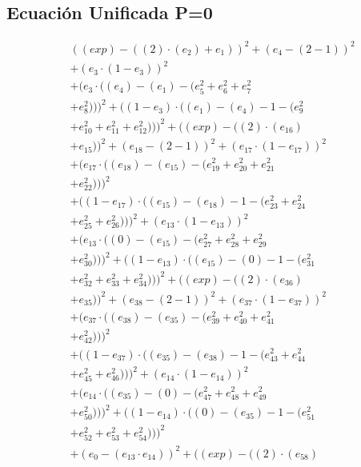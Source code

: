 \documentclass[10pt, a4paper]{article}
\begin{document}
\subsection*{Ecuación Unificada P=0}
\begin{align*}
& ((exp) - ((2)  \cdot  (e_{2}) + e_{1}))^{2} + (e_{4} - (2 - 1))^{2} \\
& + (e_{3}  \cdot  (1 - e_{3}))^{2} \\
& + (e_{3}  \cdot  ((e_{4}) - (e_{1}) - (e_{5}^{2} + e_{6}^{2} + e_{7}^{2} \\
& + e_{8}^{2})))^{2} + ((1 - e_{3})  \cdot  ((e_{1}) - (e_{4}) - 1 - (e_{9}^{2} \\
& + e_{10}^{2} + e_{11}^{2} + e_{12}^{2})))^{2} + ((exp) - ((2)  \cdot  (e_{16}) \\
& + e_{15}))^{2} + (e_{18} - (2 - 1))^{2} + (e_{17}  \cdot  (1 - e_{17}))^{2} \\
& + (e_{17}  \cdot  ((e_{18}) - (e_{15}) - (e_{19}^{2} + e_{20}^{2} + e_{21}^{2} \\
& + e_{22}^{2})))^{2} \\
& + ((1 - e_{17})  \cdot  ((e_{15}) - (e_{18}) - 1 - (e_{23}^{2} + e_{24}^{2} \\
& + e_{25}^{2} + e_{26}^{2})))^{2} + (e_{13}  \cdot  (1 - e_{13}))^{2} \\
& + (e_{13}  \cdot  ((0) - (e_{15}) - (e_{27}^{2} + e_{28}^{2} + e_{29}^{2} \\
& + e_{30}^{2})))^{2} + ((1 - e_{13})  \cdot  ((e_{15}) - (0) - 1 - (e_{31}^{2} \\
& + e_{32}^{2} + e_{33}^{2} + e_{34}^{2})))^{2} + ((exp) - ((2)  \cdot  (e_{36}) \\
& + e_{35}))^{2} + (e_{38} - (2 - 1))^{2} + (e_{37}  \cdot  (1 - e_{37}))^{2} \\
& + (e_{37}  \cdot  ((e_{38}) - (e_{35}) - (e_{39}^{2} + e_{40}^{2} + e_{41}^{2} \\
& + e_{42}^{2})))^{2} \\
& + ((1 - e_{37})  \cdot  ((e_{35}) - (e_{38}) - 1 - (e_{43}^{2} + e_{44}^{2} \\
& + e_{45}^{2} + e_{46}^{2})))^{2} + (e_{14}  \cdot  (1 - e_{14}))^{2} \\
& + (e_{14}  \cdot  ((e_{35}) - (0) - (e_{47}^{2} + e_{48}^{2} + e_{49}^{2} \\
& + e_{50}^{2})))^{2} + ((1 - e_{14})  \cdot  ((0) - (e_{35}) - 1 - (e_{51}^{2} \\
& + e_{52}^{2} + e_{53}^{2} + e_{54}^{2})))^{2} \\
& + (e_{0} - (e_{13}  \cdot  e_{14}))^{2} + ((exp) - ((2)  \cdot  (e_{58}) \\

\end{align*}
\end{document}
